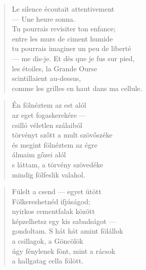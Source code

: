 \bigskip



\begin{verse}
  Le silence écoutait attentivement \\
  --- Une heure sonna. \\
  Tu pourrais revisiter ton enfance; \\
  entre les murs de ciment humide \\
  tu pourrais imaginer un peu de liberté \\
  --- me dis-je. Et dès que je fus sur pied, \\
  les étoiles, la Grande Ourse \\
  scintillaient au-dessus, \\
  comme les grilles en haut dans ma cellule.
\end{verse}

\newpage

\vspace*{-15mm}
\centeredornament



\begin{verse}
  Én fölnéztem az est alól \\
  az eget fogaskerekére --- \\
  csilló véletlen szálaiból \\
  törvényt szőtt a mult szövőszéke \\
  és megint fölnéztem az égre \\
  álmaim gőzei alól \\
  s láttam, a törvény szövedéke \\
  mindig fölfeslik valahol.
\end{verse}

\bigskip


\begin{verse}
  Fülelt a csend --- egyet ütött \\
  Fölkereshetnéd ifjúságod; \\
  nyirkos cementfalak között \\
  képzelhetsz egy kis sabadságot --- \\
  gondoltam. S hát hát amint fölállok \\
  a csillagok, a Göncölök \\
  úgy fénylenek fönt, mint a rácsok \\
  a hallgatag cella fölött.
\end{verse}

